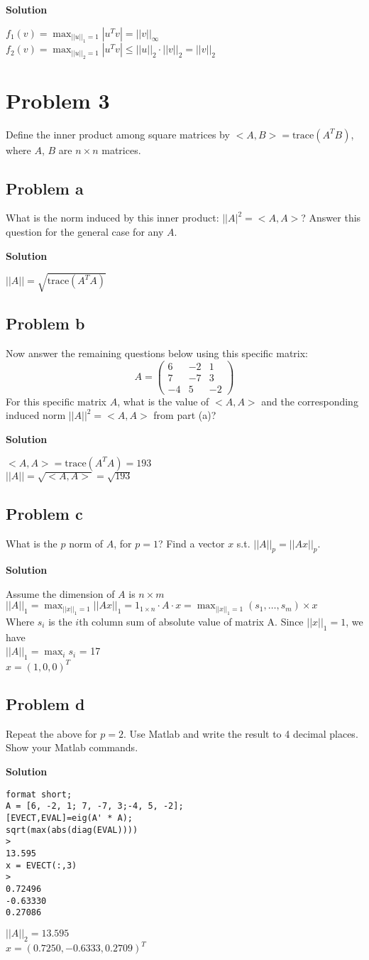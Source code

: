 \documentclass[12pt,oneside,a4paper]{article}
\newcommand{\problem}[1]
{
    \clearpage
    \section*{Problem {#1}}
}
\newcommand{\subproblem}[1]
{
    \subsection*{Problem {#1}}
}
\newcommand{\solution}
{
    \vspace{15pt}
    \noindent\ignorespaces\textbf{\large Solution}
}
\newcommand{\trace}{\mathrm{trace}}
\begin{document}
\solution

$f_{1}(v) = \max_{||u||_{1} = 1}|u^{T}v| = ||v||_{\infty}$\\
$f_{2}(v) = \max_{||u||_{2} = 1}|u^{T}v| \leq ||u||_{2}\cdot ||v||_{2} = ||v||_{2}$\\

\problem{3}
Define the inner product among square matrices by $<A, B> = \trace(A^{T}B)$, where $A$, $B$ are $n \times n$ matrices.

\subproblem{a}
What is the norm induced by this inner product: $||A|^{2}=<A, A>$? Answer this question for the general case for any $A$.

\solution

$||A|| = \sqrt{\trace(A^{T}A)}$

\subproblem{b}
Now answer the remaining questions below using this specific matrix:
$$A = \begin{pmatrix}
  6 & -2 & 1\\
  7 & -7 & 3\\
  -4 & 5 & -2
 \end{pmatrix}$$
For this specific matrix $A$, what is the value of $<A, A>$ and the corresponding induced norm $||A||^{2}=<A, A>$ from part (a)?

\solution 

$<A, A> = \trace(A^{T}A) = 193$\\
$||A|| = \sqrt{<A, A>} = \sqrt{193}$

\subproblem{c}
What is the $p$ norm of $A$, for $p = 1$? Find a vector $x$ s.t. $||A||_{p} = ||Ax||_{p}$.

\solution

Assume the dimension of $A$ is $n \times m$\\
$||A||_{1} = \max_{||x||_{1} = 1}||Ax||_{1} = 1_{1\times n} \cdot A \cdot x = \max_{||x||_{1} = 1} (s_{1},\dots,s_{m}) \times x$\\
Where $s_{i}$ is the $i$th column sum of absolute value of matrix A. Since $||x||_{1} = 1$, we have\\
$||A||_{1} = \max_{i}{s_{i}}$ = 17\\
$x = (1, 0, 0)^{T}$

\subproblem{d}
Repeat the above for $ p = 2$. Use Matlab and write the result to 4 decimal places. Show your Matlab commands.

\solution
\begin{verbatim}
format short;
A = [6, -2, 1; 7, -7, 3;-4, 5, -2];
[EVECT,EVAL]=eig(A' * A);
sqrt(max(abs(diag(EVAL))))
> 
13.595
x = EVECT(:,3)
> 
0.72496
-0.63330
0.27086

\end{verbatim}
$||A||_{2} = 13.595$\\
$x = (0.7250, -0.6333, 0.2709)^{T}$
\end{document}
